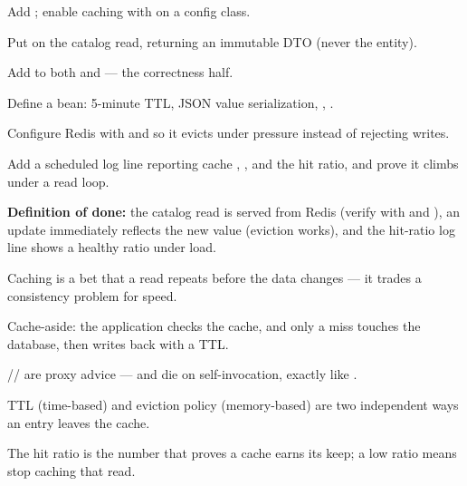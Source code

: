 \begin{buildalong}
\begin{wbitem}
  \item Add ; enable caching with  on a config class.
  \item Put  on the catalog read, returning an immutable  DTO (never the entity).
  \item Add  to both  and  --- the correctness half.
  \item Define a  bean: 5-minute TTL, JSON value serialization, , .
  \item Configure Redis with  and  so it evicts under pressure instead of rejecting writes.
  \item Add a scheduled log line reporting cache , , and the hit ratio, and prove it climbs under a read loop.
\end{wbitem}
\smallskip\textbf{Definition of done:} the catalog read is served from Redis (verify with  and ), an update immediately reflects the new value (eviction works), and the hit-ratio log line shows a healthy ratio under load.
\end{buildalong}


\begin{tickcheck}
  \item Caching is a bet that a read repeats before the data changes --- it trades a consistency problem for speed.
  \item Cache-aside: the application checks the cache, and only a miss touches the database, then writes back with a TTL.
  \item {}// are proxy advice --- and die on self-invocation, exactly like .
  \item TTL (time-based) and eviction policy (memory-based) are two independent ways an entry leaves the cache.
  \item The hit ratio is the number that proves a cache earns its keep; a low ratio means stop caching that read.
\end{tickcheck}

